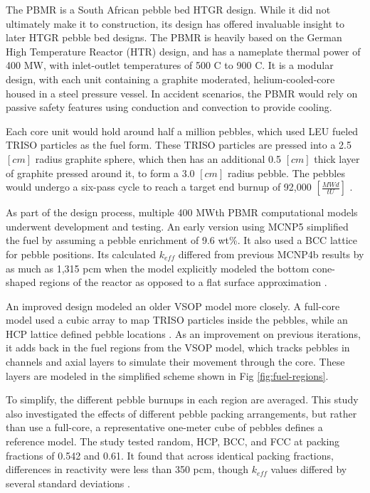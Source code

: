 The PBMR is a South African pebble bed HTGR design.  While it did not ultimately make it to construction, its design has offered invaluable insight to later HTGR pebble bed designs.  The PBMR is heavily based on the German High Temperature Reactor (HTR) design, and has a nameplate thermal power of 400 MW, with inlet-outlet temperatures of 500 \textdegree C to 900 \textdegree C.  It is a modular design, with each unit containing a graphite moderated, helium-cooled-core housed in a steel pressure vessel.  In accident scenarios, the PBMR would rely on passive safety features using conduction and convection to provide cooling.

Each core unit would hold around half a million pebbles, which used LEU fueled TRISO particles as the fuel form.  These TRISO particles are pressed into a 2.5 $\left[cm\right]$ radius graphite sphere, which then has an additional 0.5 $\left[cm\right]$ thick layer of graphite pressed around it, to form a 3.0 $\left[cm\right]$ radius pebble.  The pebbles would undergo a six-pass cycle to reach a target end burnup of 92,000 $\left[\frac{MWd}{tU}\right]$ \cite{venter_pbmr_2005}.

As part of the design process, multiple 400 MWth PBMR computational models underwent development and testing.  An early version using MCNP5 simplified the fuel by assuming a pebble enrichment of 9.6 wt\%.  It also used a BCC lattice for pebble positions.  Its calculated $k_{eff}$ differed from previous MCNP4b results by as much as 1,315 pcm when the model explicitly modeled the bottom cone-shaped regions of the reactor as opposed to a flat surface approximation \cite{kim_monte_2005}.

An improved design modeled an older VSOP model more closely.  A full-core model used a cubic array to map TRISO particles inside the pebbles, while an HCP lattice defined pebble locations \cite{albornoz_mcnp_2006}.  As an improvement on previous iterations, it adds back in the fuel regions from the VSOP model, which tracks pebbles in channels and axial layers to simulate their movement through the core.  These layers are modeled in the simplified scheme shown in Fig \ref{fig:fuel-regions}.



To simplify, the different pebble burnups in each region are averaged.  This study also investigated the effects of different pebble packing arrangements, but rather than use a full-core, a representative one-meter cube of pebbles defines a reference model.  The study tested random, HCP, BCC, and FCC at packing fractions of 0.542 and 0.61.  It found that across identical packing fractions, differences in reactivity were less than 350 pcm, though $k_{eff}$ values differed by several standard deviations \cite{albornoz_mcnp_2006}.

